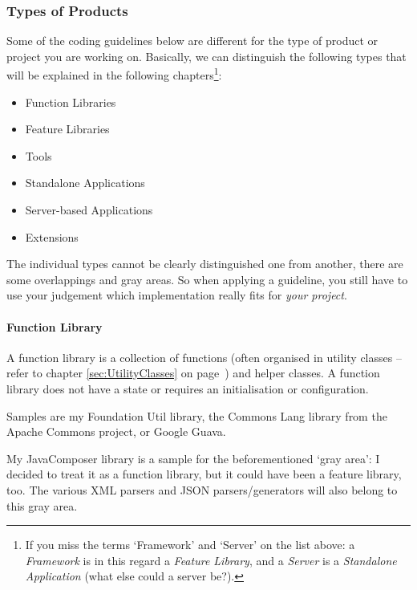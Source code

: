 \documentclass[11pt,a4paper, titlepage, parskip=half, headsepline, footsepline, cleardoublepage=current, headheight=1cm]{scrbook}
\newcommand*{\tqvref}[1]{\hyperref[{#1}]{\ref*{#1}} on page~\pageref{#1}}
\begin{document}
\subsubsection{Types of Products}\label{sec:TypesOfProducts}
Some of the coding guidelines below are different for the type of product or project you are working on. Basically, we can distinguish the following types that will be explained in the following chapters\footnote{If you miss the terms ‘Framework’ and ‘Server’ on the list above: a \textit{Framework} is in this regard a \textit{Feature Library}, and a \textit{Server} is a \textit{Standalone Application} (what else could a server be?).}:
\begin{itemize}[nosep]
\item{Function Libraries}
\item{Feature Libraries}
\item{Tools}
\item{Standalone Applications}
\item{Server-based Applications}
\item{Extensions}
\end{itemize}
The individual types cannot be clearly distinguished one from another, there are some overlappings and gray areas. So when applying a guideline, you still have to use your judgement which implementation really fits for \textit{your project}.


\paragraph{Function Library}\label{sec:FunctionLibrary}
A function library is a collection of functions (often organised in utility classes – refer to chapter \tqvref{sec:UtilityClasses}) and helper classes. A function library does not have a state or requires an initialisation or configuration.

Samples are my Foundation Util library\autocite{TQUADRAT_ORG_FOUNDATION_UTIL}, the Commons Lang library from the Apache Commons project\autocite{APACHE_COMMONS_LANG}, or Google Guava\autocite{GOOGLE_GUAVA}.

My JavaComposer library\autocite{TQUADRAT_ORG_FOUNDATION_JAVACOMPOSER} is a sample for the beforementioned ‘gray area’: I decided to treat it as a function library, but it could have been a feature library, too. The various XML parsers and JSON parsers/generators will also belong to this gray area. 
\end{document}

